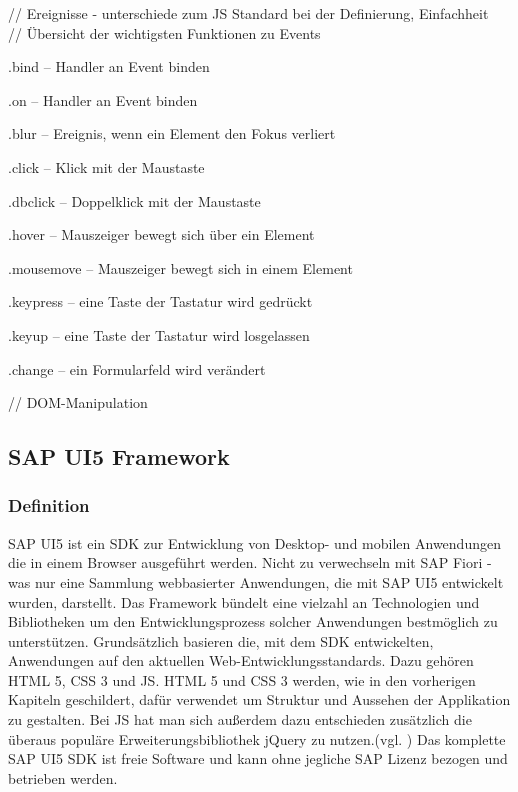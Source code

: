 \documentclass[12pt,a4paper,bibliography=totocnumbered,listof=totocnumbered]{scrartcl}
\begin{document}
// Ereignisse - unterschiede zum JS Standard bei der Definierung, Einfachheit\\

// Übersicht der wichtigsten Funktionen zu Events
    \begin{compactitem}
	    \item .bind – Handler an Event binden
	    \item .on – Handler an Event binden
	    \item .blur – Ereignis, wenn ein Element den Fokus verliert
	    \item .click – Klick mit der Maustaste
	    \item .dbclick – Doppelklick mit der Maustaste
	    \item .hover – Mauszeiger bewegt sich über ein Element
	    \item .mousemove – Mauszeiger bewegt sich in einem Element
	    \item .keypress – eine Taste der Tastatur wird gedrückt
	    \item .keyup – eine Taste der Tastatur wird losgelassen
	    \item .change – ein Formularfeld wird verändert
    \end{compactitem}
    
// DOM-Manipulation\\


\subsection{SAP UI5 Framework}
\subsubsection{Definition}
SAP UI5 ist ein \ac{SDK} zur Entwicklung von Desktop- und mobilen Anwendungen die in einem Browser ausgeführt werden. Nicht zu verwechseln mit SAP Fiori - was nur eine Sammlung webbasierter Anwendungen, die mit SAP UI5 entwickelt wurden, darstellt. Das Framework bündelt eine vielzahl an Technologien und Bibliotheken um den Entwicklungsprozess solcher Anwendungen bestmöglich zu unterstützen. Grundsätzlich basieren die, mit dem SDK entwickelten, Anwendungen auf den aktuellen Web-Entwicklungsstandards. Dazu gehören HTML 5, CSS 3 und JS. HTML 5 und CSS 3 werden, wie in den vorherigen Kapiteln geschildert, dafür verwendet um Struktur und Aussehen der Applikation zu gestalten. Bei JS hat man sich außerdem dazu entschieden zusätzlich die überaus populäre Erweiterungsbibliothek jQuery zu nutzen.(vgl. \cite{BuiltWith2014}) Das komplette SAP UI5 SDK ist freie Software und kann ohne jegliche SAP Lizenz bezogen und betrieben werden.
\end{document}
